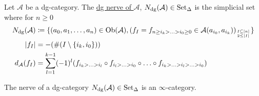 \begin{defi}
	Let $ \mathcal{ A } $ be a dg-category. 
	The \underline{dg nerve of $ \mathcal{ A } $}, $ N_{ \operatorname{dg} } ( \mathcal{ A } ) \in \operatorname{Set}_{\Delta} $ is the simplicial set where for $ n \geq 0 $
	\begin{align*}
		N_{ \operatorname{dg} } ( \mathcal{ A } ) 
		&\coloneqq 
		\{ ( a_0 , a_1 , \dotsc , a_n ) \in \operatorname{Ob} ( \mathcal{ A } ) , ( f_I = f_{ n \geq i_k > \dotsc > i_0 \geq 0 } \in \mathcal{ A } ( a_{ i_0 } , a_{ i_k } ) )_{ I \subseteq [ n ] \atop 2 \leq \lvert I \rvert } \}
		\\
		\lvert f_I \rvert 
		&=
		- ( \# ( I \setminus \{ i_k , i_0 \} ) ) 
		\\
		d_{ \mathcal{ A } } ( f_I ) 
		&=
		\sum_{ l = 1 }^{ k - 1 } ( - 1 )^l ( f_{ i_k > \dotsc > i_l } \circ f_{ i_l > \dotsc > i_0 } \circ \dotsc \circ f_{ i_k > \dotsc > i_l > \dotsc > i_0 })
	\end{align*}
\end{defi}

\begin{thm}
	The nerve of a dg-category $ N_{ \operatorname{dg} } ( \mathcal{ A } ) \in \operatorname{Set}_{\Delta} $ is an $ \infty $-category.
\end{thm}



